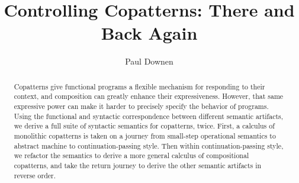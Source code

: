 \documentclass[sigplan,screen]{acmart}
\begin{document}
\title{Controlling Copatterns: There and Back Again}

\author{Paul Downen}

\renewcommand{\shortauthors}{Downen}

\begin{abstract}
  Copatterns give functional programs a flexible mechanism for responding to
  their context, and composition can greatly enhance their expressiveness.
  However, that same expressive power can make it harder to precisely specify
  the behavior of programs.  Using the functional and syntactic correspondence
  between different semantic artifacts, we derive a full suite of syntactic
  semantics for copatterns, twice.  First, a calculus of monolithic copatterns
  is taken on a journey from small-step operational semantics to abstract
  machine to continuation-passing style.  Then within continuation-passing
  style, we refactor the semantics to derive a more general calculus of
  compositional copatterns, and take the return journey to derive the other
  semantic artifacts in reverse order.
\end{abstract}

\begin{CCSXML}
\end{CCSXML}

\end{document}
